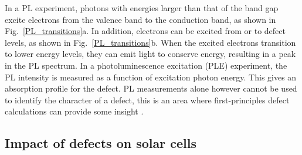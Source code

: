 \documentclass[11pt, twoside]{report}
\begin{document}

In a PL experiment, photons with energies larger than that of the band gap excite electrons from the valence band to the conduction band, as shown in Fig.~\ref{PL_transitions}a. In addition, electrons can be excited from or to defect levels, as shown in Fig.~\ref{PL_transitions}b. When the excited electrons transition to lower energy levels, they can emit light to conserve energy, resulting in a peak in the PL spectrum. In a photoluminescence excitation (PLE) experiment, the PL intensity is measured as a function of excitation photon energy. This gives an absorption profile for the defect. 
PL measurements alone however cannot be used to identify the character of a defect, this is an area where first-principles defect calculations can provide some insight \cite{defects_tutorial}. 

\subsection{Impact of defects on {\CZTS} solar cells}\label{CZTS_defects_lit}
\end{document}
